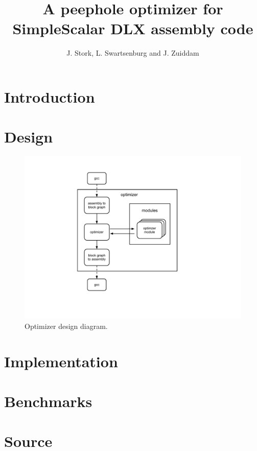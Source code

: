 \documentclass{scrreprt}
\title{A peephole optimizer for SimpleScalar DLX assembly code}
\author{J. Stork, L. Swartsenburg and J. Zuiddam}
\begin{document}
\maketitle
\chapter{Introduction}

\chapter{Design}

\begin{figure}[h]
\centering
\includegraphics[viewport= 170 90 510 490, clip=true]{diagram}
\caption{Optimizer design diagram.}
\label{fig:diagram}
\end{figure}

\chapter{Implementation}
\chapter{Benchmarks}
\appendix
\chapter{Source}
\end{document}
